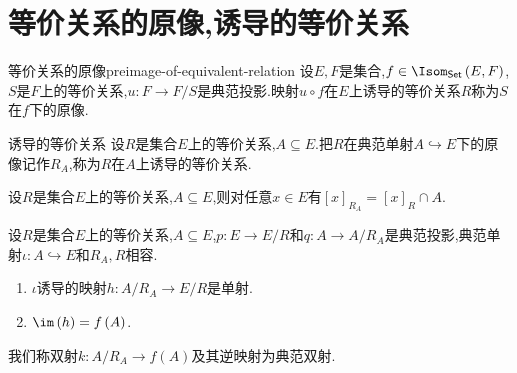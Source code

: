 \section{等价关系的原像,诱导的等价关系}

\begin{definition}{等价关系的原像}{preimage-of-equivalent-relation}
	设$E,F$是集合,$f\in\Isom_{\mathsf{Set}}\left(E,F\right)$,$S$是$F$上的等价关系,$u:F\to F/S$是典范投影.映射$u\circ f$在$E$上诱导的等价关系$R$称为$S$在$f$下的原像.
\end{definition}

\begin{definition}{诱导的等价关系}{}
	设$R$是集合$E$上的等价关系,$A\subseteq E$.把$R$在典范单射$A\hookrightarrow E$下的原像记作$R_{A}$,称为$R$在$A$上诱导的等价关系.
\end{definition}

\begin{proposition}{}{}
	设$R$是集合$E$上的等价关系,$A\subseteq E$,则对任意$x\in E$有$\left[x\right]_{R_{A}}=\left[x\right]_{R}\cap A$.
\end{proposition}

\begin{proposition}{}{}
	设$R$是集合$E$上的等价关系,$A\subseteq E$,$p:E\to E/R$和$q:A\to A/R_{A}$是典范投影,典范单射$\iota:A\hookrightarrow E$和$R_{A},R$相容.
	\begin{enumerate}
		\item $\iota$诱导的映射$h:A/R_{A}\to E/R$是单射.
		\item $\im\left(h\right)=f\left(A\right)$.
	\end{enumerate}
	我们称双射$k:A/R_{A}\to f\left(A\right)$及其逆映射为典范双射.
\end{proposition}








